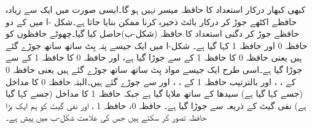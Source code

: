 کبھی کبھار درکار استعداد کا حافظہ میسر نہیں ہو گا۔ایسی صورت میں ایک سے زیادہ حافظے اکٹھے جوڑ کر درکار بائٹ ذخیرہ کرنا ممکن بنایا جاتا ہے۔شکل -ا میں  کے دو حافظے جوڑ کر دگنی استعداد کا  حافظہ  (شکل-ب)حاصل کیا گیا۔چھوٹے حافظوں کو حافظہ 0 اور حافظہ 1 کہا گیا ہے۔ شکل-ا میں ایک جیسے پتہ بِٹ ساتھ ساتھ جوڑے گئے ہیں یعنی حافظہ 0 کا  حافظہ 1 کے  سے جوڑا گیا ہے، اور حافظہ 0 کا  حافظہ 1 کے  سے جوڑا گیا ہے۔اسی طرح ایک جیسے مواد بِٹ ساتھ ساتھ جوڑے گئے ہیں یعنی حافظہ 0 کے ، ،  اور  بالترتیب حافظہ 1 کے ، ،  اور  سے جوڑے گئے ہیں۔البتہ حافظہ 0 کا  مداخل (جسے کہا گیا ہے) سیدھا  کے ساتھ ملایا گیا ہے جبکہ حافظہ 1 کا  مداخل (جسے  کہا گیا ہے) نفی گیٹ کے ذریعہ  سے جوڑا گیا ہے۔ حافظہ 0، حافظہ 1 ، اور نفی گیٹ  کو  ہم ایک بڑا حافظہ تصور کر سکتے ہیں جس کی علامت شکل-ب میں پیش ہے۔


